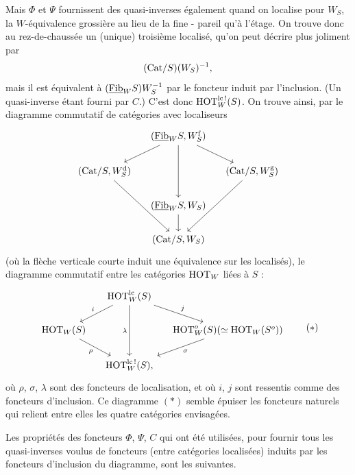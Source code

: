 Mais $\Phi$ et $\Psi$ fournissent des quasi-inverses également quand on localise pour $W_S$, la $W$-équivalence grossière au lieu de la fine - pareil qu’à l’étage. On trouve donc au rez-de-chaussée un (unique) troisième localisé, qu’on peut décrire plus joliment par
\[
(\mathrm{Cat}/S)(W_S)^{-1},
\]
mais il est équivalent à $(\underline{\mathrm{Fib}}_W S)W_S^{-1}$ par le
foncteur induit par l’inclusion. (Un quasi-inverse étant fourni par $C$.) C’est donc $\mathrm{HOT}^{\mathrm{lc}\,!}_W(S)$. On trouve ainsi, par le diagramme commutatif de catégories avec localiseurs
\[
\begin{tikzcd}[column sep=small]
 & (\Fib_W S, W^{\mathrm{f}}_S) \arrow[dl] \arrow[dd] \arrow[dr] & \\
(\Cat/S, W^{\mathrm{d}}_S) \arrow[ddr] & & (\Cat/S, W^{\mathrm{g}}_S) \arrow[ddl] \\
 & (\Fib_W S, W_S) \arrow[d] & \\
 & (\Cat/S, W_S) &
\end{tikzcd}
\]
(où la flèche verticale courte induit une équivalence sur les localisés), le diagramme commutatif entre les catégories $\mathrm{HOT}_W$ liées à $S$ :
\[
\begin{tikzcd}[column sep=small]
 & \HOT^{\mathrm{lc}}_W(S) \arrow[dl, "i"'] \arrow[dd, "\lambda"'] \arrow[dr, "j"] & \\
\HOT_W(S) \arrow[dr, "\rho"'] & & \HOT^{o}_W(S)(\simeq \HOT_W(S^{o})) \arrow[dl, "\sigma"] \\
 & \HOT^{\lcs}_W(S), &
\end{tikzcd}
\tag*{$(\ast)$}
\]
où $\rho$, $\sigma$, $\lambda$ sont des foncteurs de localisation, et où $i$, $j$ sont ressentis comme des foncteurs d’inclusion. Ce diagramme $(\ast)$ semble épuiser les foncteurs naturels qui relient entre elles les quatre catégories envisagées.

\noindent{}
Les propriétés des foncteurs $\Phi$, $\Psi$, $C$ qui ont été utilisées, pour fournir tous les quasi-inverses voulus de foncteurs (entre catégories localisées) induits par les foncteurs d’inclusion du diagramme, sont les suivantes.

